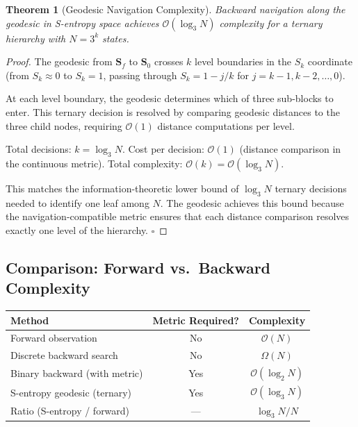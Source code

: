 \documentclass[12pt,twocolumn]{article}
\newtheorem{theorem}{Theorem}[section]
\begin{document}
\begin{theorem}[Geodesic Navigation Complexity]
\label{thm:geodesic_complexity}
Backward navigation along the geodesic in S-entropy space achieves $\mathcal{O}(\log_3 N)$ complexity for a ternary hierarchy with $N = 3^k$ states.
\end{theorem}

\begin{proof}
The geodesic from $\mathbf{S}_f$ to $\mathbf{S}_0$ crosses $k$ level boundaries in the $S_k$ coordinate (from $S_k \approx 0$ to $S_k = 1$, passing through $S_k = 1 - j/k$ for $j = k-1, k-2, \ldots, 0$).

At each level boundary, the geodesic determines which of three sub-blocks to enter. This ternary decision is resolved by comparing geodesic distances to the three child nodes, requiring $\mathcal{O}(1)$ distance computations per level.

Total decisions: $k = \log_3 N$.
Cost per decision: $\mathcal{O}(1)$ (distance comparison in the continuous metric).
Total complexity: $\mathcal{O}(k) = \mathcal{O}(\log_3 N)$.

This matches the information-theoretic lower bound of $\log_3 N$ ternary decisions needed to identify one leaf among $N$. The geodesic achieves this bound because the navigation-compatible metric ensures that each distance comparison resolves exactly one level of the hierarchy. $\square$
\end{proof}

\subsection{Comparison: Forward vs.\ Backward Complexity}

\begin{center}
\begin{tabular}{lcc}
\toprule
Method & Metric Required? & Complexity \\
\midrule
Forward observation & No & $\mathcal{O}(N)$ \\
Discrete backward search & No & $\Omega(N)$ \\
Binary backward (with metric) & Yes & $\mathcal{O}(\log_2 N)$ \\
S-entropy geodesic (ternary) & Yes & $\mathcal{O}(\log_3 N)$ \\
\midrule
Ratio (S-entropy / forward) & --- & $\log_3 N / N$ \\
\bottomrule
\end{tabular}
\end{center}
\end{document}
